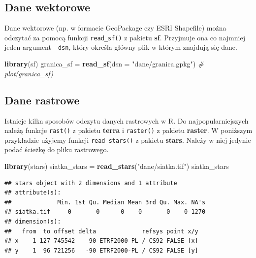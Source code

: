 \documentclass[
  paper=6in:9in,pagesize=pdftex,headinclude=on,footinclude=on,10pt]{scrbook}
\newenvironment{Shaded}{\begin{snugshade}}{\end{snugshade}}
\newcommand{\AttributeTok}[1]{\textcolor[rgb]{0.13,0.29,0.53}{#1}}
\newcommand{\CommentTok}[1]{\textcolor[rgb]{0.56,0.35,0.01}{\textit{#1}}}
\newcommand{\FunctionTok}[1]{\textcolor[rgb]{0.13,0.29,0.53}{\textbf{#1}}}
\newcommand{\NormalTok}[1]{#1}
\newcommand{\OtherTok}[1]{\textcolor[rgb]{0.56,0.35,0.01}{#1}}
\newcommand{\StringTok}[1]{\textcolor[rgb]{0.31,0.60,0.02}{#1}}
\begin{document}
\subsection{Dane wektorowe}\label{dane-wektorowe}

Dane wektorowe (np. w formacie GeoPackage czy ESRI Shapefile) można odczytać za pomocą funkcji \texttt{read\_sf()} z pakietu \textbf{sf}.
Przyjmuje ona co najmniej jeden argument - \texttt{dsn}, który określa główny plik w którym znajdują się dane.

\begin{Shaded}
\begin{Highlighting}[]
\FunctionTok{library}\NormalTok{(sf)}
\NormalTok{granica\_sf }\OtherTok{=} \FunctionTok{read\_sf}\NormalTok{(}\AttributeTok{dsn =} \StringTok{"dane/granica.gpkg"}\NormalTok{)}
\CommentTok{\# plot(granica\_sf)}
\end{Highlighting}
\end{Shaded}

\subsection{Dane rastrowe}\label{dane-rastrowe}

Istnieje kilka sposobów odczytu danych rastrowych w R.
Do najpopularniejszych należą funkcje \texttt{rast()} z pakietu \textbf{terra} i \texttt{raster()} z pakietu \textbf{raster}.
W poniższym przykładzie użyjemy funkcji \texttt{read\_stars()} z pakietu \textbf{stars}.
Należy w niej jedynie podać ścieżkę do pliku rastrowego.

\begin{Shaded}
\begin{Highlighting}[]
\FunctionTok{library}\NormalTok{(stars)}
\NormalTok{siatka\_stars }\OtherTok{=} \FunctionTok{read\_stars}\NormalTok{(}\StringTok{"dane/siatka.tif"}\NormalTok{)}
\NormalTok{siatka\_stars}
\end{Highlighting}
\end{Shaded}

\begin{verbatim}
## stars object with 2 dimensions and 1 attribute
## attribute(s):
##             Min. 1st Qu. Median Mean 3rd Qu. Max. NA's
## siatka.tif     0       0      0    0       0    0 1270
## dimension(s):
##   from  to offset delta             refsys point x/y
## x    1 127 745542    90 ETRF2000-PL / CS92 FALSE [x]
## y    1  96 721256   -90 ETRF2000-PL / CS92 FALSE [y]
\end{verbatim}
\end{document}

